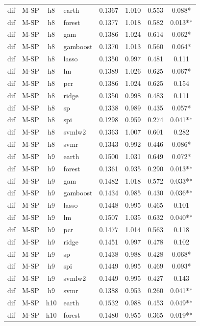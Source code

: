 \begin{ThreePartTable}
\begin{longtable}[t]{llclcccc}
\addlinespace
dif & M-SP & h8 & earth & 0.1367 & 1.010 & 0.553 & 0.088*\\
dif & M-SP & h8 & forest & 0.1377 & 1.018 & 0.582 & 0.013**\\
dif & M-SP & h8 & gam & 0.1386 & 1.024 & 0.614 & 0.062*\\
dif & M-SP & h8 & gamboost & 0.1370 & 1.013 & 0.560 & 0.064*\\
dif & M-SP & h8 & lasso & 0.1350 & 0.997 & 0.481 & 0.111\\
dif & M-SP & h8 & lm & 0.1389 & 1.026 & 0.625 & 0.067*\\
dif & M-SP & h8 & pcr & 0.1386 & 1.024 & 0.625 & 0.154\\
dif & M-SP & h8 & ridge & 0.1350 & 0.998 & 0.483 & 0.111\\
dif & M-SP & h8 & sp & 0.1338 & 0.989 & 0.435 & 0.057*\\
dif & M-SP & h8 & spi & 0.1298 & 0.959 & 0.274 & 0.041**\\
dif & M-SP & h8 & svmlw2 & 0.1363 & 1.007 & 0.601 & 0.282\\
dif & M-SP & h8 & svmr & 0.1343 & 0.992 & 0.446 & 0.086*\\
\addlinespace
dif & M-SP & h9 & earth & 0.1500 & 1.031 & 0.649 & 0.072*\\
dif & M-SP & h9 & forest & 0.1361 & 0.935 & 0.290 & 0.013**\\
dif & M-SP & h9 & gam & 0.1482 & 1.018 & 0.572 & 0.033**\\
dif & M-SP & h9 & gamboost & 0.1434 & 0.985 & 0.430 & 0.036**\\
dif & M-SP & h9 & lasso & 0.1448 & 0.995 & 0.465 & 0.101\\
dif & M-SP & h9 & lm & 0.1507 & 1.035 & 0.632 & 0.040**\\
dif & M-SP & h9 & pcr & 0.1477 & 1.014 & 0.563 & 0.118\\
dif & M-SP & h9 & ridge & 0.1451 & 0.997 & 0.478 & 0.102\\
dif & M-SP & h9 & sp & 0.1438 & 0.988 & 0.428 & 0.068*\\
dif & M-SP & h9 & spi & 0.1449 & 0.995 & 0.469 & 0.093*\\
dif & M-SP & h9 & svmlw2 & 0.1449 & 0.995 & 0.427 & 0.143\\
dif & M-SP & h9 & svmr & 0.1388 & 0.953 & 0.260 & 0.041**\\
\addlinespace
dif & M-SP & h10 & earth & 0.1532 & 0.988 & 0.453 & 0.049**\\
dif & M-SP & h10 & forest & 0.1480 & 0.955 & 0.365 & 0.019**\\

\end{longtable}
\end{ThreePartTable}
